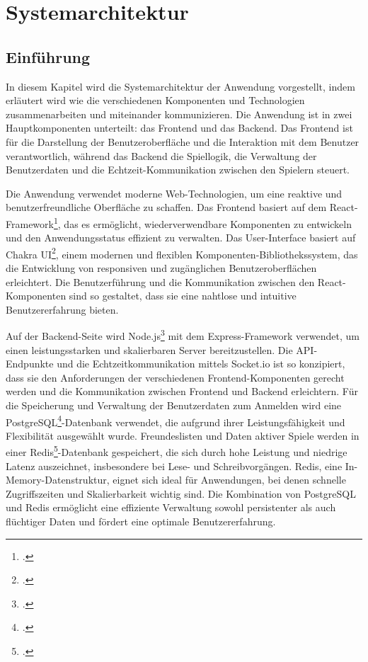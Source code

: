        
\chapter{Systemarchitektur}
\section{Einführung}
In diesem Kapitel wird die Systemarchitektur der Anwendung vorgestellt, indem erläutert wird wie die verschiedenen Komponenten und Technologien zusammenarbeiten und miteinander kommunizieren.
Die Anwendung ist in zwei Hauptkomponenten unterteilt: das Frontend und das Backend. Das Frontend ist für die Darstellung der Benutzeroberfläche und die Interaktion mit dem Benutzer verantwortlich, während das Backend die Spiellogik, die Verwaltung der Benutzerdaten und die Echtzeit-Kommunikation zwischen den Spielern steuert.

Die Anwendung verwendet moderne Web-Technologien, um eine reaktive und benutzerfreundliche Oberfläche zu schaffen. Das Frontend basiert auf dem React-Framework\footcite{react}, das es ermöglicht, wiederverwendbare Komponenten zu entwickeln und den Anwendungsstatus effizient zu verwalten. Das User-Interface basiert auf Chakra UI\footcite{chakraui}, einem modernen und flexiblen Komponenten-Bibliothekssystem, das die Entwicklung von responsiven und zugänglichen Benutzeroberflächen erleichtert. Die Benutzerführung und die Kommunikation zwischen den React-Komponenten sind so gestaltet, dass sie eine nahtlose und intuitive Benutzererfahrung bieten.

Auf der Backend-Seite wird Node.js\footcite{nodejs} mit dem Express-Framework verwendet, um einen leistungsstarken und skalierbaren Server bereitzustellen. Die API-Endpunkte und die Echtzeitkommunikation mittels Socket.io ist so konzipiert, dass sie den Anforderungen der verschiedenen Frontend-Komponenten gerecht werden und die Kommunikation zwischen Frontend und Backend erleichtern. Für die Speicherung und Verwaltung der Benutzerdaten zum Anmelden wird eine PostgreSQL\footcite{postgresql}-Datenbank verwendet, die aufgrund ihrer Leistungsfähigkeit und Flexibilität ausgewählt wurde. Freundeslisten und Daten aktiver Spiele werden in einer Redis\footcite{redis}-Datenbank gespeichert, die sich durch hohe Leistung und niedrige Latenz auszeichnet, insbesondere bei Lese- und Schreibvorgängen. Redis, eine In-Memory-Datenstruktur, eignet sich ideal für Anwendungen, bei denen schnelle Zugriffszeiten und Skalierbarkeit wichtig sind. Die Kombination von PostgreSQL und Redis ermöglicht eine effiziente Verwaltung sowohl persistenter als auch flüchtiger Daten und fördert eine optimale Benutzererfahrung.
